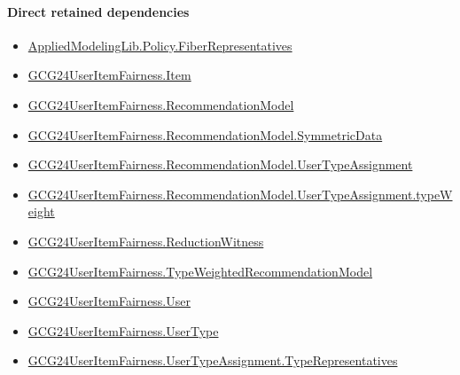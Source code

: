 \documentclass[10pt]{article}
\begin{document}
\paragraph{Direct retained dependencies}
\begin{itemize}\raggedright
\item \hyperlink{governing-declaration-4a6c7763869ee04f}{Applied\allowbreak{}Modeling\allowbreak{}Lib.\allowbreak{}Policy.\allowbreak{}Fiber\allowbreak{}Representatives}
\item \hyperlink{governing-declaration-a7c560a429c6e204}{GCG24\allowbreak{}User\allowbreak{}Item\allowbreak{}Fairness.\allowbreak{}Item}
\item \hyperlink{governing-declaration-4b845f20f80fb146}{GCG24\allowbreak{}User\allowbreak{}Item\allowbreak{}Fairness.\allowbreak{}Recommendation\allowbreak{}Model}
\item \hyperlink{governing-declaration-5bf2c3489c614d0a}{GCG24\allowbreak{}User\allowbreak{}Item\allowbreak{}Fairness.\allowbreak{}Recommendation\allowbreak{}Model.\allowbreak{}Symmetric\allowbreak{}Data}
\item \hyperlink{governing-declaration-ff90b1efab93f1aa}{GCG24\allowbreak{}User\allowbreak{}Item\allowbreak{}Fairness.\allowbreak{}Recommendation\allowbreak{}Model.\allowbreak{}User\allowbreak{}Type\allowbreak{}Assignment}
\item \hyperlink{governing-declaration-9b21245f9866121e}{GCG24\allowbreak{}User\allowbreak{}Item\allowbreak{}Fairness.\allowbreak{}Recommendation\allowbreak{}Model.\allowbreak{}User\allowbreak{}Type\allowbreak{}Assignment.\allowbreak{}type\allowbreak{}Weight}
\item \hyperlink{governing-declaration-09e04866bceb3cdb}{GCG24\allowbreak{}User\allowbreak{}Item\allowbreak{}Fairness.\allowbreak{}Reduction\allowbreak{}Witness}
\item \hyperlink{governing-declaration-9d0d71ba8ee67837}{GCG24\allowbreak{}User\allowbreak{}Item\allowbreak{}Fairness.\allowbreak{}Type\allowbreak{}Weighted\allowbreak{}Recommendation\allowbreak{}Model}
\item \hyperlink{governing-declaration-800dd691bc989470}{GCG24\allowbreak{}User\allowbreak{}Item\allowbreak{}Fairness.\allowbreak{}User}
\item \hyperlink{governing-declaration-fd2c25ccc96ab645}{GCG24\allowbreak{}User\allowbreak{}Item\allowbreak{}Fairness.\allowbreak{}User\allowbreak{}Type}
\item \hyperlink{governing-declaration-24b9f83db4e5e94a}{GCG24\allowbreak{}User\allowbreak{}Item\allowbreak{}Fairness.\allowbreak{}User\allowbreak{}Type\allowbreak{}Assignment.\allowbreak{}Type\allowbreak{}Representatives}
\end{itemize}
\hypertarget{governing-declaration-74d9be2e84dd2134}{}
\end{document}
